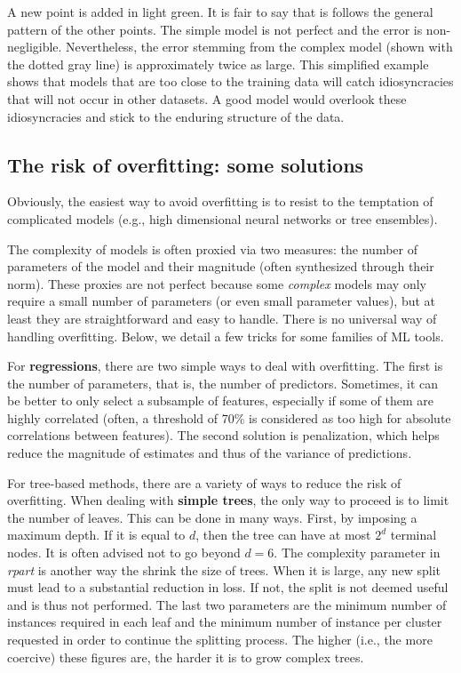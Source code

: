 \documentclass[]{krantz}
\theoremstyle{definition}
\theoremstyle{definition}
\theoremstyle{definition}
\theoremstyle{remark}
\begin{document}
A new point is added in light green. It is fair to say that is follows
the general pattern of the other points. The simple model is not perfect
and the error is non-negligible. Nevertheless, the error stemming from
the complex model (shown with the dotted gray line) is approximately
twice as large. This simplified example shows that models that are too
close to the training data will catch idiosyncracies that will not occur
in other datasets. A good model would overlook these idiosyncracies and
stick to the enduring structure of the data.

\hypertarget{the-risk-of-overfitting-some-solutions}{%
\subsection{The risk of overfitting: some
solutions}\label{the-risk-of-overfitting-some-solutions}}

Obviously, the easiest way to avoid overfitting is to resist to the
temptation of complicated models (e.g., high dimensional neural networks
or tree ensembles).

The complexity of models is often proxied via two measures: the number
of parameters of the model and their magnitude (often synthesized
through their norm). These proxies are not perfect because some
\emph{complex} models may only require a small number of parameters (or
even small parameter values), but at least they are straightforward and
easy to handle. There is no universal way of handling overfitting.
Below, we detail a few tricks for some families of ML tools.

For \textbf{regressions}, there are two simple ways to deal with
overfitting. The first is the number of parameters, that is, the number
of predictors. Sometimes, it can be better to only select a subsample of
features, especially if some of them are highly correlated (often, a
threshold of 70\% is considered as too high for absolute correlations
between features). The second solution is penalization, which helps
reduce the magnitude of estimates and thus of the variance of
predictions.

For tree-based methods, there are a variety of ways to reduce the risk
of overfitting. When dealing with \textbf{simple trees}, the only way to
proceed is to limit the number of leaves. This can be done in many ways.
First, by imposing a maximum depth. If it is equal to \(d\), then the
tree can have at most \(2^d\) terminal nodes. It is often advised not to
go beyond \(d=6\). The complexity parameter in \emph{rpart} is another
way the shrink the size of trees. When it is large, any new split must
lead to a substantial reduction in loss. If not, the split is not deemed
useful and is thus not performed. The last two parameters are the
minimum number of instances required in each leaf and the minimum number
of instance per cluster requested in order to continue the splitting
process. The higher (i.e., the more coercive) these figures are, the
harder it is to grow complex trees.
\end{document}
